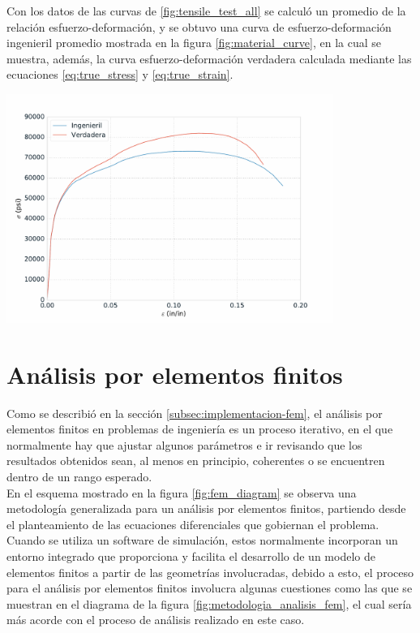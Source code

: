 Con los datos de las curvas de \ref{fig:tensile_test_all} se calculó un promedio de la relación esfuerzo-deformación, 
y se obtuvo una curva de esfuerzo-deformación ingenieril promedio mostrada en la figura \ref{fig:material_curve}, 
en la cual se muestra, además, la curva esfuerzo-deformación verdadera calculada mediante las ecuaciones 
\ref{eq:true_stress} y \ref{eq:true_strain}.

\begin{center}
\includegraphics[width=0.8\textwidth]{src/ch3/material_curve.pdf}
\label{fig:material_curve}
\end{center}

\section{Análisis por elementos finitos}\label{sec:fea}

Como se describió en la sección \ref{subsec:implementacion-fem}, el análisis por elementos 
finitos en problemas de ingeniería es un proceso iterativo, en el que normalmente hay que ajustar 
algunos parámetros e ir revisando que los resultados obtenidos sean, al menos en principio, 
coherentes o se encuentren dentro de un rango esperado. \\

En el esquema mostrado en la figura \ref{fig:fem_diagram} se observa una metodología generalizada 
para un análisis por elementos finitos, partiendo desde el planteamiento de las 
ecuaciones diferenciales que gobiernan el problema. Cuando se utiliza un software 
de simulación, estos normalmente incorporan un entorno integrado que 
proporciona y facilita el desarrollo de un modelo de elementos finitos a partir 
de las geometrías involucradas, debido a esto, el proceso para el análisis por elementos 
finitos involucra algunas cuestiones como las que se muestran en el diagrama de 
la figura \ref{fig:metodologia_analisis_fem}, el cual sería más acorde con 
el proceso de análisis realizado en este caso.

